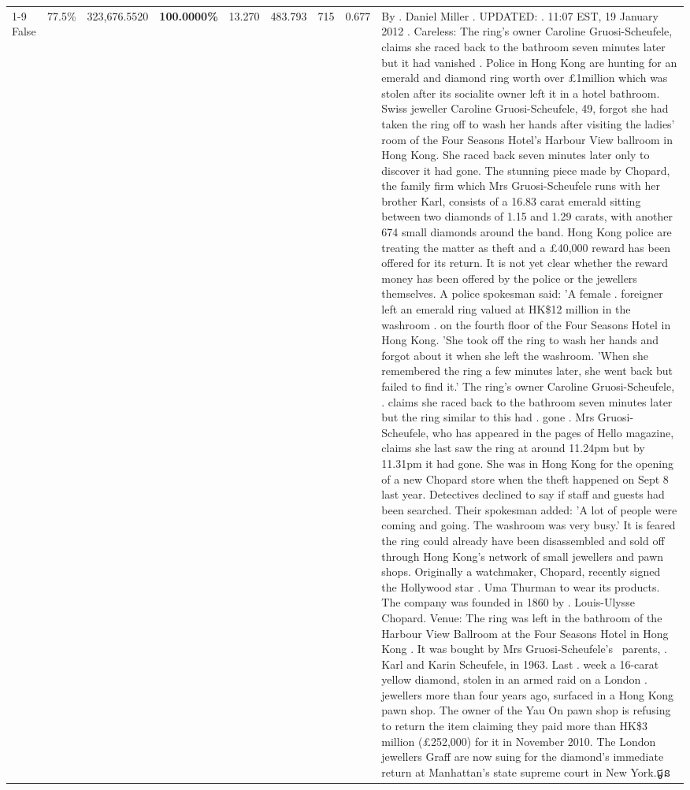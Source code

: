 \begin{table}[H]
\begin{tabular}{lllrlllll}
\cline{1-9}
False & 77.5\% & 323,676.5520 & \bfseries \color{red} 100.0000\% & 13.270 & 483.793 & 715 & 0.677 & By . Daniel Miller . UPDATED: . 11:07 EST, 19 January 2012 . Careless: The ring's owner Caroline Gruosi-Scheufele, claims she raced back to the bathroom seven minutes later but it had vanished . Police in Hong Kong are hunting for an emerald and diamond ring worth over £1million which was stolen after its socialite owner left it in a hotel bathroom. Swiss jeweller Caroline Gruosi-Scheufele, 49, forgot she had taken the ring off to wash her hands after visiting the ladies' room of the Four Seasons Hotel's Harbour View ballroom in Hong Kong. She raced back seven minutes later only to discover it had gone. The stunning piece made by Chopard, the family firm which Mrs Gruosi-Scheufele runs with her brother Karl, consists of a 16.83 carat emerald sitting between two diamonds of 1.15 and 1.29 carats, with another 674 small diamonds around the band. Hong Kong police are treating the matter as theft and a £40,000 reward has been offered for its return. It is not yet clear whether the reward money has been offered by the police or the jewellers themselves. A police spokesman said: 'A female . foreigner left an emerald ring valued at HK\$12 million in the washroom . on the fourth floor of the Four Seasons Hotel in Hong Kong. 'She took off the ring to wash her hands and forgot about it when she left the washroom. 'When she remembered the ring a few minutes later, she went back but failed to find it.' The ring's owner Caroline Gruosi-Scheufele, . claims she raced back to the bathroom seven minutes later but the ring similar to this had . gone . Mrs Gruosi-Scheufele, who has appeared in the pages of Hello magazine, claims she last saw the ring at around 11.24pm but by 11.31pm it had gone. She was in Hong Kong for the opening of a new Chopard store when the theft happened on Sept 8 last year. Detectives declined to say if staff and guests had been searched. Their spokesman added: 'A lot of people were coming and going. The washroom was very busy.' It is feared the ring could already have been disassembled and sold off through Hong Kong's network of small jewellers and pawn shops. Originally a watchmaker, Chopard, recently signed the Hollywood star . Uma Thurman to wear its products. The company was founded in 1860 by . Louis-Ulysse Chopard. Venue: The ring was left in the bathroom of the Harbour View Ballroom at the Four Seasons Hotel in Hong Kong . It was bought by Mrs Gruosi-Scheufele's  parents, . Karl and Karin Scheufele, in 1963. Last . week a 16-carat yellow diamond, stolen in an armed raid on a London . jewellers more than four years ago, surfaced in a Hong Kong pawn shop. The owner of the Yau On pawn shop is refusing to return the item claiming they paid more than HK\$3 million (£252,000) for it in November 2010. The London jewellers Graff are now suing for the diamond’s immediate return at Manhattan’s state supreme court in New York.ជូន \\

\end{tabular}
\end{table}
